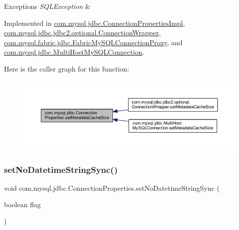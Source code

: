 \begin{DoxyExceptions}{Exceptions}
{\em S\+Q\+L\+Exception} & \\
\hline
\end{DoxyExceptions}


Implemented in \mbox{\hyperlink{classcom_1_1mysql_1_1jdbc_1_1_connection_properties_impl_ab678e3d922115fa48bda9b44611aca06}{com.\+mysql.\+jdbc.\+Connection\+Properties\+Impl}}, \mbox{\hyperlink{classcom_1_1mysql_1_1jdbc_1_1jdbc2_1_1optional_1_1_connection_wrapper_aa2b3fbef9bed38d8dd555e8f0f7c3598}{com.\+mysql.\+jdbc.\+jdbc2.\+optional.\+Connection\+Wrapper}}, \mbox{\hyperlink{classcom_1_1mysql_1_1fabric_1_1jdbc_1_1_fabric_my_s_q_l_connection_proxy_afa6b95db40a3b8445e74979f597ae415}{com.\+mysql.\+fabric.\+jdbc.\+Fabric\+My\+S\+Q\+L\+Connection\+Proxy}}, and \mbox{\hyperlink{classcom_1_1mysql_1_1jdbc_1_1_multi_host_my_s_q_l_connection_a2403357756bbbdea09d2773f42ea3501}{com.\+mysql.\+jdbc.\+Multi\+Host\+My\+S\+Q\+L\+Connection}}.

Here is the caller graph for this function\+:\nopagebreak
\begin{figure}[H]
\begin{center}
\leavevmode
\includegraphics[width=350pt]{interfacecom_1_1mysql_1_1jdbc_1_1_connection_properties_aa29a8dc1d36b7044717dce95a3ddbc4e_icgraph}
\end{center}
\end{figure}
\mbox{\label{interfacecom_1_1mysql_1_1jdbc_1_1_connection_properties_a01c8815660b50a6db2e6f89f796e3ee9}} 
\subsubsection{\texorpdfstring{set\+No\+Datetime\+String\+Sync()}{setNoDatetimeStringSync()}}
{\footnotesize\ttfamily void com.\+mysql.\+jdbc.\+Connection\+Properties.\+set\+No\+Datetime\+String\+Sync (\begin{DoxyParamCaption}\item[{boolean}]{flag }\end{DoxyParamCaption})}


